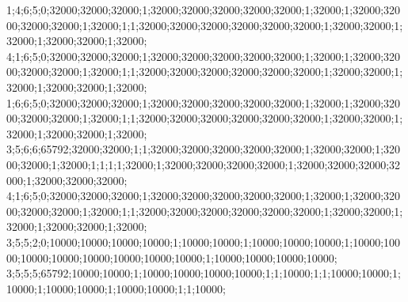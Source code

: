 1;4;6;5;0;32000;32000;32000;1;32000;32000;32000;32000;32000;1;32000;1;32000;32000;32000;32000;1;32000;1;1;32000;32000;32000;32000;32000;32000;1;32000;32000;1;32000;1;32000;32000;1;32000;
4;1;6;5;0;32000;32000;32000;1;32000;32000;32000;32000;32000;1;32000;1;32000;32000;32000;32000;1;32000;1;1;32000;32000;32000;32000;32000;32000;1;32000;32000;1;32000;1;32000;32000;1;32000;
1;6;6;5;0;32000;32000;32000;1;32000;32000;32000;32000;32000;1;32000;1;32000;32000;32000;32000;1;32000;1;1;32000;32000;32000;32000;32000;32000;1;32000;32000;1;32000;1;32000;32000;1;32000;
3;5;6;6;65792;32000;32000;1;1;32000;32000;32000;32000;32000;1;32000;32000;1;32000;32000;1;32000;1;1;1;1;32000;1;32000;32000;32000;32000;1;32000;32000;32000;32000;1;32000;32000;32000;
4;1;6;5;0;32000;32000;32000;1;32000;32000;32000;32000;32000;1;32000;1;32000;32000;32000;32000;1;32000;1;1;32000;32000;32000;32000;32000;32000;1;32000;32000;1;32000;1;32000;32000;1;32000;
3;5;5;2;0;10000;10000;10000;10000;1;10000;10000;1;10000;10000;10000;1;10000;10000;10000;10000;10000;10000;10000;10000;1;10000;10000;10000;10000;
3;5;5;5;65792;10000;10000;1;10000;10000;10000;10000;1;1;10000;1;1;10000;10000;1;10000;1;10000;10000;1;10000;10000;1;1;10000;
